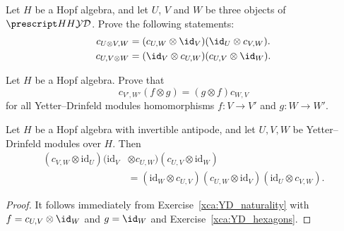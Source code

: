 \begin{exercise}
\label{xca:YD_hexagons}
Let $H$ be a Hopf algebra, and let $U$, $V$ and $W$
be three objects of $\ydH$. Prove the following statements: 
\begin{align}
c_{U\otimes V,W} & =(c_{U,W}\otimes\id_{V})(\id_{U}\otimes c_{V,W}).\label{eq:(cx1)(1xc)}\\
c_{U,V\otimes W} & =(\id_{V}\otimes c_{U,W})(c_{U,V}\otimes\id_{W})\label{eq:(1xc)(cx1)}.
\end{align}
\end{exercise}

\begin{exercise}
\label{xca:YD_naturality}
Let $H$ be a Hopf algebra. Prove that 
\[
c_{V',W'}(f\otimes g)=(g\otimes f)c_{W,V}
\]
for all Yetter--Drinfeld modules homomorphisms $f:V\to V'$ and $g:W\to W'$. 
\end{exercise}

\begin{theorem}
\label{theorem:YD_braid_equation}
Let $H$ be a Hopf algebra with invertible antipode, and let $U,V,W$
be Yetter--Drinfeld modules over $H$. Then 
\begin{align*}
(c_{V,W}\otimes\textrm{id}_{U})(\textrm{id}_{V}&\otimes c_{U,W})(c_{U,V}\otimes\textrm{id}_{W})\\
&=(\textrm{id}_{W}\otimes c_{U,V})(c_{U,W}\otimes\textrm{id}_{V})(\textrm{id}_{U}\otimes c_{V,W}).
\end{align*}
\end{theorem}

\begin{proof} 
It follows immediately from Exercise~\ref{xca:YD_naturality} with
$f=c_{U,V}\otimes\id_W$ and $g=\id_W$ and Exercise~\ref{xca:YD_hexagons}.
\end{proof}


